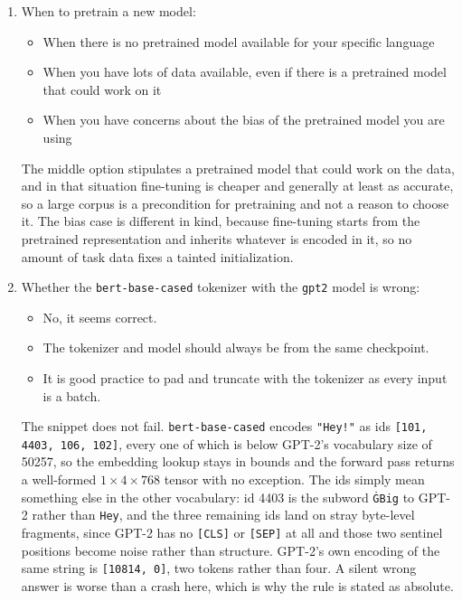 \documentclass[11pt]{article}
\begin{document}
\begin{enumerate}
  \item When to pretrain a new model:
        \begin{itemize}
          \item[{[X]}] When there is no pretrained model available for your specific language
          \item[{[\ ]}] When you have lots of data available, even if there is a pretrained model that could
                work on it
          \item[{[X]}] When you have concerns about the bias of the pretrained model you are using
        \end{itemize}
        The middle option stipulates a pretrained model that could work on the data, and in that
        situation fine-tuning is cheaper and generally at least as accurate, so a large corpus is a
        precondition for pretraining and not a reason to choose it. The bias case is
        different in kind, because fine-tuning starts from the pretrained representation and inherits whatever
        is encoded in it, so no amount of task data fixes a tainted initialization.

  \item Whether the \texttt{bert-base-cased} tokenizer with the \texttt{gpt2} model is wrong:
        \begin{itemize}
          \item[{[\ ]}] No, it seems correct.
          \item[{[X]}] The tokenizer and model should always be from the same checkpoint.
          \item[{[\ ]}] It is good practice to pad and truncate with the tokenizer as every input is a batch.
        \end{itemize}
        The snippet does not fail. \texttt{bert-base-cased} encodes \texttt{"Hey!"} as ids \texttt{[101, 4403, 106, 102]}, every one of
        which is below GPT-2's vocabulary size of 50257, so the embedding lookup stays in bounds and the forward
        pass returns a well-formed $1 \times 4 \times 768$ tensor with no exception. The ids simply mean
        something else in the other vocabulary: id 4403 is the subword \texttt{\.{G}Big} to GPT-2 rather than
        \texttt{Hey}, and the three remaining ids land on stray byte-level fragments, since GPT-2 has no
        \texttt{[CLS]} or \texttt{[SEP]} at all and those two sentinel positions become noise rather than
        structure. GPT-2's own encoding of the same string is \texttt{[10814, 0]}, two tokens rather than four. A silent
        wrong answer is worse than a crash here, which is why the rule is stated as absolute.
\end{enumerate}
\end{document}
